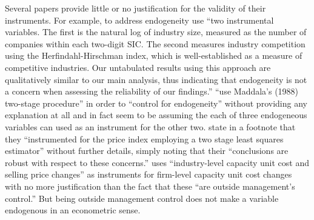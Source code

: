 Several papers provide little or no justification for the validity of their instruments. For example, to address endogeneity \citet{Cohen:2014jl} use ``two instrumental variables. The first is the natural log of industry size, measured as the number of companies within each two-digit SIC. The second measures industry competition using the Herfindahl-Hirschman index, which is well-established as a measure of competitive industries. Our untabulated results using this approach are qualitatively similar to our main analysis, thus indicating that endogeneity is not a concern when assessing the reliability of our findings.''
\citet{Vermeer:2014bs} ``use Maddala's (1988) two-stage procedure'' in order to ``control for endogeneity'' without providing any explanation at all and in fact seem to be assuming the each of three endogeneous variables can used as an instrument for the other two.
\citet[p.48]{Fox:2014io} state in a footnote that they ``instrumented for the price index employing a two stage least squares estimator'' without further details, simply noting that their ``conclusions are robust with respect to these concerns.''
\citet{Cannon:2014im} uses ``industry-level capacity unit cost and selling price changes'' as instruments for firm-level capacity unit cost changes with no more justification than the fact that these ``are outside management's control.'' But being outside management control does not make a variable endogenous in an econometric sense.

